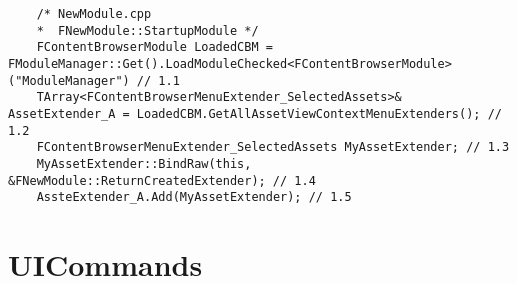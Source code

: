         \begin{lstlisting}
    /* NewModule.cpp 
    *  FNewModule::StartupModule */
    FContentBrowserModule LoadedCBM = FModuleManager::Get().LoadModuleChecked<FContentBrowserModule>("ModuleManager") // 1.1
    TArray<FContentBrowserMenuExtender_SelectedAssets>& AssetExtender_A = LoadedCBM.GetAllAssetViewContextMenuExtenders(); // 1.2
    FContentBrowserMenuExtender_SelectedAssets MyAssetExtender; // 1.3
    MyAssetExtender::BindRaw(this, &FNewModule::ReturnCreatedExtender); // 1.4
    AssteExtender_A.Add(MyAssetExtender); // 1.5
        \end{lstlisting}

    \section{UICommands}
